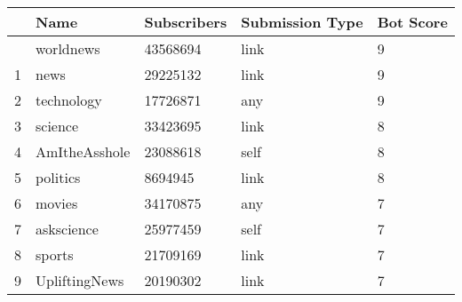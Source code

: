 \documentclass[
  letterpaper,
  DIV=11,
  numbers=noendperiod]{scrartcl}
\begin{document}
\begin{longtable}[]{@{}lllll@{}}
\toprule\noalign{}
& Name & Subscribers & Submission Type & Bot Score \\
\midrule\noalign{}
\endhead
\bottomrule\noalign{}
\endlastfoot
0 & worldnews & 43568694 & link & 9 \\
1 & news & 29225132 & link & 9 \\
2 & technology & 17726871 & any & 9 \\
3 & science & 33423695 & link & 8 \\
4 & AmItheAsshole & 23088618 & self & 8 \\
5 & politics & 8694945 & link & 8 \\
6 & movies & 34170875 & any & 7 \\
7 & askscience & 25977459 & self & 7 \\
8 & sports & 21709169 & link & 7 \\
9 & UpliftingNews & 20190302 & link & 7 \\
\end{longtable}
\end{document}
